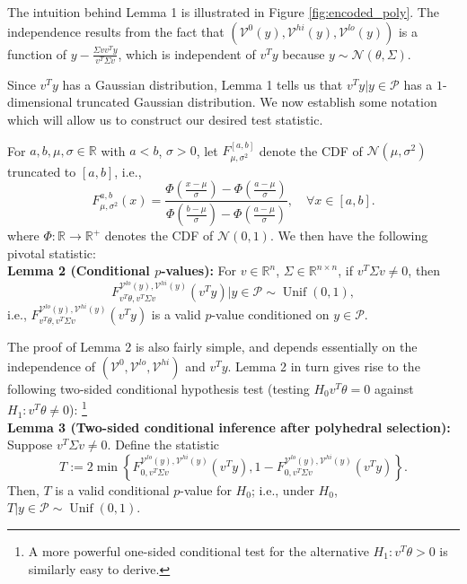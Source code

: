 \documentclass{article}
\newcommand{\R}{\mathbb{R}}
\newcommand{\Unif}{\operatorname{Unif}}
\newcommand{\Nrm}{\mathcal{N}}
\newcommand{\poly}{\mathcal{P}}
\newcommand{\V}{\mathcal{V}}
\begin{document}
The intuition behind Lemma 1 is illustrated in Figure \ref{fig:encoded_poly}.
The independence results from the fact that $(\V^0(y),\V^{hi}(y),\V^{lo}(y))$
is a function of $y - \frac{\Sigma v v^T y}{v^T \Sigma v}$, which is
independent of $v^T y$ because $y \sim \Nrm(\theta,\Sigma)$.

Since $v^T y$ has a Gaussian distribution, Lemma 1 tells us that
$v^T y | y \in \poly$ has a $1$-dimensional truncated Gaussian distribution.
We now establish some notation which will allow us to construct our desired
test statistic.

For $a,b,\mu,\sigma \in \R$ with $a < b$, $\sigma > 0$, let
$F_{\mu,\sigma^2}^{[a,b]}$ denote the CDF of $\Nrm(\mu, \sigma^2)$ truncated
to $[a,b]$, i.e.,
\[F_{\mu,\sigma^2}^{a,b}(x)
    = \frac{\Phi\left( \frac{x - \mu}{\sigma} \right)
                                - \Phi\left( \frac{a - \mu}{\sigma} \right)}
    {\Phi\left( \frac{b - \mu}{\sigma} \right)
                                - \Phi\left( \frac{a - \mu}{\sigma} \right)},
    \quad \forall x \in [a,b].
\]
where $\Phi : \R \to \R^+$ denotes the CDF of $\Nrm(0, 1)$.
We then have the following pivotal statistic: \\

{\bf Lemma 2 (Conditional $p$-values):} For $v \in \R^n$,
$\Sigma \in \R^{n \times n}$, if $v^T \Sigma v \neq 0$, then
\[F^{\V^{lo}(y), \V^{hi}(y)}_{v^T \theta, v^T \Sigma v}(v^T y) | y \in \poly
    \sim \Unif(0,1),\]
i.e., $F^{\V^{lo}(y), \V^{hi}(y)}_{v^T \theta, v^T \Sigma v}(v^T y)$ is a valid
$p$-value conditioned on $y \in \poly$.

The proof of Lemma 2 is also fairly simple, and depends essentially on the
independence of $(\V^0,\V^{lo},\V^{hi})$ and $v^T y$. Lemma 2 in turn gives
rise to the following two-sided conditional hypothesis test (testing
$H_0 v^T \theta = 0$ against $H_1 : v^T \theta \neq 0$):
\footnote{A more powerful one-sided conditional test for the alternative
$H_1 : v^T \theta > 0$ is similarly easy to derive.} \\

{\bf Lemma 3 (Two-sided conditional inference after polyhedral selection):}
Suppose $v^T \Sigma v \neq 0$. Define the statistic
\[T := 2 \min \left\{ F^{\V^{lo}(y),\V^{hi}(y)}_{0,v^T \Sigma v}(v^T y),
            1 - F^{\V^{lo}(y),\V^{hi}(y)}_{0,v^T \Sigma v}(v^T y) \right\}.\]
Then, $T$ is a valid conditional $p$-value for $H_0$; i.e., under $H_0$,
$T | y \in \poly \sim \Unif(0,1)$. \\
\end{document}
